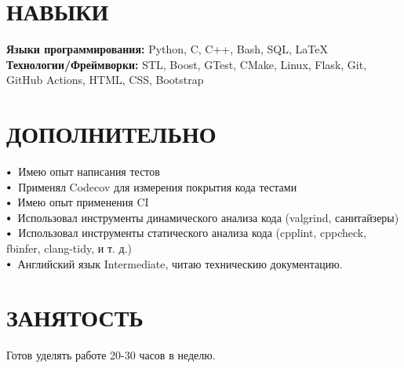 \documentclass[letterpaper,11pt]{article}
\newcommand\sbullet[1][.5]{\mathbin{\vcenter{\hbox{\scalebox{#1}{$\bullet$}}}}}
\begin{document}
    
\vspace{-12pt}

\section{НАВЫКИ}
 \begin{itemize}[leftmargin=0.15in, label={}]
    \small{\item{
     \textbf{\normalsize{Языки программирования:}}{ \normalsize{Python, C, C++, Bash, SQL, \LaTeX}} \\
     \textbf{\normalsize{Технологии/Фреймворки:}}{\normalsize{ STL, Boost, GTest, CMake, Linux, Flask, Git, GitHub Actions, HTML, CSS, Bootstrap}} \\
    }}
 \end{itemize}
 \vspace{-15pt}
 
\section{ДОПОЛНИТЕЛЬНО}

$\sbullet[.75] \hspace{0.1cm}$ {{Имею опыт написания тестов}} \hspace{1.6cm} \\
$\sbullet[.75] \hspace{0.1cm}$ {{Применял Codecov для измерения покрытия кода тестами}} \hspace{2.59cm} \\
$\sbullet[.75] \hspace{0.2cm}${{Имею опыт применения CI}}\\

$\sbullet[.75] \hspace{0.2cm}${{Использовал инструменты динамического анализа кода (valgrind, санитайзеры)}} \hspace{1cm} \\
$\sbullet[.75] \hspace{0.1cm}$ {Использовал инструменты статического анализа кода (cpplint, cppcheck, fbinfer, clang-tidy, и т. д.)} \hspace{2.6cm} \\
$\sbullet[.75] \hspace{0.2cm}${{Английский язык Intermediate, читаю техническию документацию.}} \\

\section{ЗАНЯТОСТЬ}

Готов уделять работе 20-30 часов в неделю.
\end{document}
